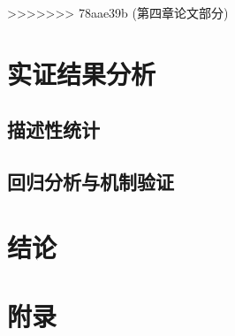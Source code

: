 \documentclass[a4paper,11pt, fontset=fandol]{ctexart}
\begin{document}
>>>>>>> 78aae39b (第四章论文部分)


\newpage

\section{实证结果分析}

\subsection{描述性统计}

\subsection{回归分析与机制验证}


\newpage

\section{结论}

\newpage

\section*{附录}


\newpage
\end{document}
